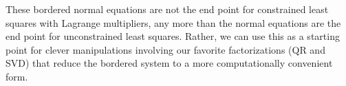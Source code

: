 \documentclass[12pt, leqno]{article} %
\begin{document}
These bordered normal equations are not the end point for constrained
least squares  with Lagrange multipliers, any more than the normal
equations are the end point for unconstrained least squares.  Rather,
we can use this as a starting point for clever manipulations involving
our favorite factorizations (QR and SVD) that reduce the bordered system
to a more computationally convenient form.
\end{document}
